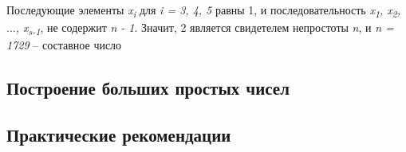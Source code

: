   Последующие элементы \textit{{x\textsubscript{i}}} для \textit{i = 3, 4, 5} равны 1, и последовательность 
\textit{{x\textsubscript{1}, x\textsubscript{2}, {$\dots$}, x\textsubscript{s-1}}}, 
не содержит \textit{n - 1}. Значит, 2 является свидетелем непростоты \textit{n}, и \textit{n = 1729} – составное число

\subsection{Построение больших простых чисел}

\subsection{Практические рекомендации}

  
  
